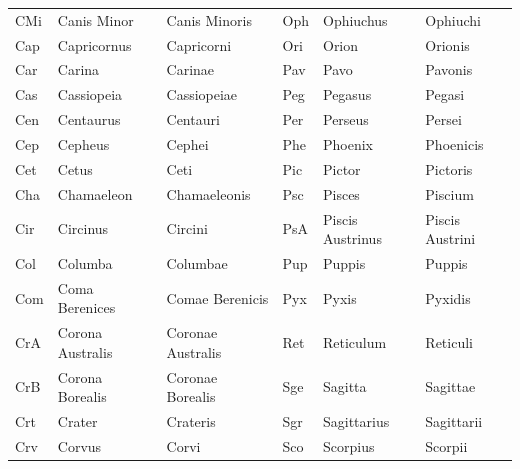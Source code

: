 \begin{table}[p]
\begin{tabular}{lll||lll}
CMi & Canis Minor          & Canis Minoris         & Oph & Ophiuchus            & Ophiuchi              \\
Cap & Capricornus          & Capricorni            & Ori & Orion                & Orionis               \\
Car & Carina               & Carinae               & Pav & Pavo                 & Pavonis               \\
Cas & Cassiopeia           & Cassiopeiae           & Peg & Pegasus              & Pegasi                \\
Cen & Centaurus            & Centauri              & Per & Perseus              & Persei                \\
Cep & Cepheus              & Cephei                & Phe & Phoenix              & Phoenicis             \\
Cet & Cetus                & Ceti                  & Pic & Pictor               & Pictoris              \\
Cha & Chamaeleon           & Chamaeleonis          & Psc & Pisces               & Piscium               \\
Cir & Circinus             & Circini               & PsA & Piscis Austrinus     & Piscis Austrini       \\
Col & Columba              & Columbae              & Pup & Puppis               & Puppis                \\
Com & Coma Berenices       & Comae Berenicis       & Pyx & Pyxis                & Pyxidis               \\
CrA & Corona Australis     & Coronae Australis     & Ret & Reticulum            & Reticuli              \\
CrB & Corona Borealis      & Coronae Borealis      & Sge & Sagitta              & Sagittae              \\
Crt & Crater               & Crateris              & Sgr & Sagittarius          & Sagittarii            \\
Crv & Corvus               & Corvi                 & Sco & Scorpius             & Scorpii               \\

\end{tabular}
\end{table}
